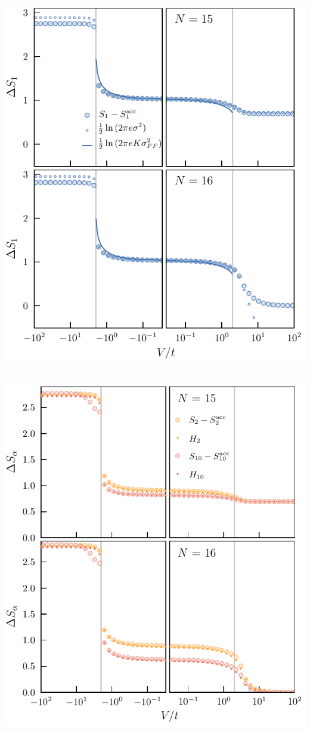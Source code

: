 	\subsection{}
		\includegraphics{deltaS1_N15N16}
		
	\subsection{}
		\includegraphics{higherAlphaDeltaS_N15N16.pdf}

